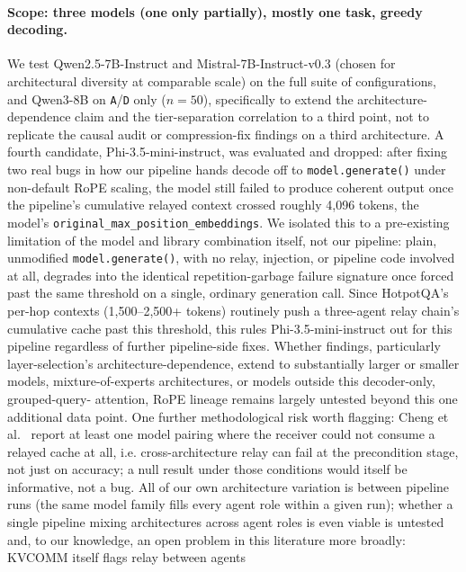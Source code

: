 \documentclass[11pt]{article}
\begin{document}
\paragraph{Scope: three models (one only partially), mostly one task,
greedy decoding.} We test Qwen2.5-7B-Instruct and Mistral-7B-Instruct-v0.3
(chosen for architectural diversity at comparable scale) on the full
suite of configurations, and Qwen3-8B on \texttt{A}/\texttt{D} only
($n=50$), specifically to extend the architecture-dependence claim and
the tier-separation correlation to a third point, not to replicate the
causal audit or compression-fix findings on a third architecture. A
fourth candidate, Phi-3.5-mini-instruct, was evaluated and dropped: after
fixing two real bugs in how our pipeline hands decode off to
\texttt{model.generate()} under non-default RoPE scaling, the model still
failed to produce coherent output once the pipeline's cumulative relayed
context crossed roughly 4{,}096 tokens, the model's
\texttt{original\_max\_position\_embeddings}. We isolated this to a
pre-existing limitation of the model and library combination itself, not
our pipeline: plain, unmodified \texttt{model.generate()}, with no relay,
injection, or pipeline code involved at all, degrades into the identical
repetition-garbage failure signature once forced past the same threshold
on a single, ordinary generation call. Since HotpotQA's per-hop contexts
(1{,}500--2{,}500+ tokens) routinely push a three-agent relay chain's
cumulative cache past this threshold, this rules Phi-3.5-mini-instruct
out for this pipeline regardless of further pipeline-side fixes. Whether
findings, particularly layer-selection's architecture-dependence, extend
to substantially larger or smaller models, mixture-of-experts
architectures, or models outside this decoder-only, grouped-query-
attention, RoPE lineage remains largely untested beyond this one
additional data point. One further methodological risk worth flagging:
Cheng et al.\ \citep{latentcommpay2026} report at least one model pairing
where the receiver could not consume a relayed cache at all, i.e.
cross-architecture relay can fail at the precondition stage, not just on
accuracy; a null result under those conditions would itself be
informative, not a bug. All of our own architecture variation is between
pipeline runs (the same model family fills every agent role within a
given run); whether a single pipeline mixing architectures across agent
roles is even viable is untested and, to our knowledge, an open problem
in this literature more broadly: KVCOMM itself flags relay between agents
\end{document}
